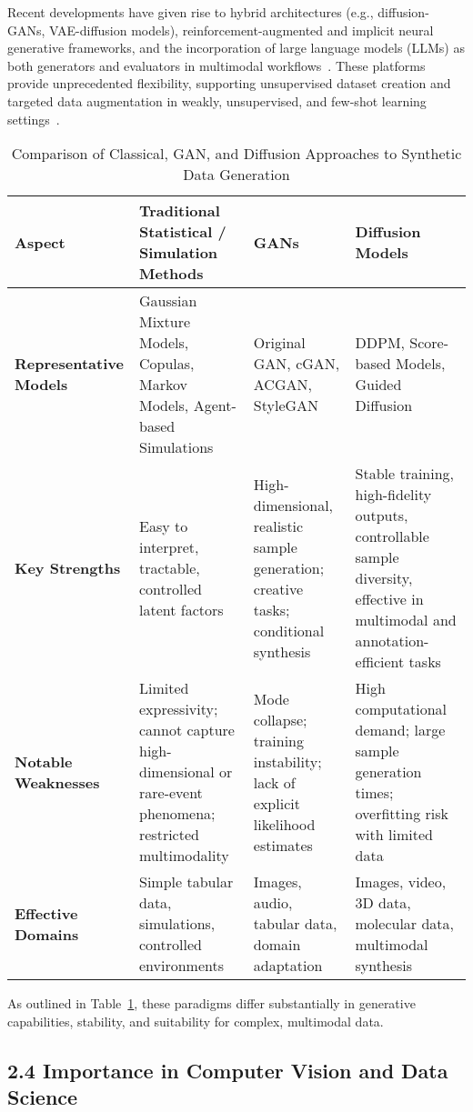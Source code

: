 \documentclass[11pt]{article}
\begin{document}
Recent developments have given rise to hybrid architectures (e.g., diffusion-GANs, VAE-diffusion models), reinforcement-augmented and implicit neural generative frameworks, and the incorporation of large language models (LLMs) as both generators and evaluators in multimodal workflows~\cite{2,6,13,16,18,22,23,82,89,90}. These platforms provide unprecedented flexibility, supporting unsupervised dataset creation and targeted data augmentation in weakly, unsupervised, and few-shot learning settings~\cite{12,23,26,27,64,81}.

\begin{table}[t]
\centering
\caption{Comparison of Classical, GAN, and Diffusion Approaches to Synthetic Data Generation}
\label{tab:method_comparison}
\begin{tabular}{|l|p{4.2cm}|p{4.2cm}|p{4.2cm}|}
\hline
\textbf{Aspect} & \textbf{Traditional Statistical / Simulation Methods} & \textbf{GANs} & \textbf{Diffusion Models} \\
\hline
\textbf{Representative Models} & Gaussian Mixture Models, Copulas, Markov Models, Agent-based Simulations & Original GAN, cGAN, ACGAN, StyleGAN & DDPM, Score-based Models, Guided Diffusion \\
\hline
\textbf{Key Strengths} & Easy to interpret, tractable, controlled latent factors & High-dimensional, realistic sample generation; creative tasks; conditional synthesis & Stable training, high-fidelity outputs, controllable sample diversity, effective in multimodal and annotation-efficient tasks \\
\hline
\textbf{Notable Weaknesses} & Limited expressivity; cannot capture high-dimensional or rare-event phenomena; restricted multimodality & Mode collapse; training instability; lack of explicit likelihood estimates & High computational demand; large sample generation times; overfitting risk with limited data \\
\hline
\textbf{Effective Domains} & Simple tabular data, simulations, controlled environments & Images, audio, tabular data, domain adaptation & Images, video, 3D data, molecular data, multimodal synthesis \\
\hline
\end{tabular}
\end{table}

As outlined in Table~\ref{tab:method_comparison}, these paradigms differ substantially in generative capabilities, stability, and suitability for complex, multimodal data.

\subsection{2.4 Importance in Computer Vision and Data Science}
\end{document}
